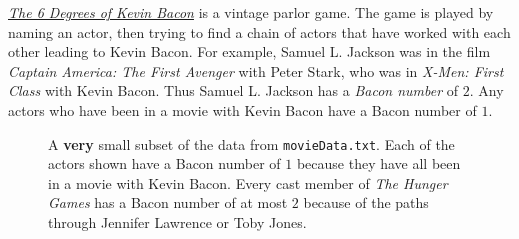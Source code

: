 \href{http://oracleofbacon.org/help.php}{\emph{The 6 Degrees of Kevin Bacon}} is a vintage parlor game.
The game is played by naming an actor, then trying to find a chain of actors that have worked with each other leading to Kevin Bacon.
For example, Samuel L. Jackson was in the film \emph{Captain America: The First Avenger} with Peter Stark, who was in \emph{X-Men: First Class} with Kevin Bacon.
Thus Samuel L. Jackson has a \emph{Bacon number} of $2$.
Any actors who have been in a movie with Kevin Bacon have a Bacon number of $1$.
\begin{figure}
\centering
{}
\caption{A \textbf{very} small subset of the data from \texttt{movieData.txt}.
Each of the actors shown have a Bacon number of $1$ because they have all been in a movie with Kevin Bacon.
Every cast member of \emph{The Hunger Games} has a Bacon number of at most $2$ because of the paths through Jennifer Lawrence or Toby Jones.}
\end{figure}

